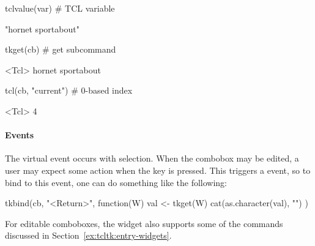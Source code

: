 \begin{Schunk}
\begin{Sinput}
 tclvalue(var)                           # TCL variable
\end{Sinput}
\begin{Soutput}
[1] "hornet sportabout"
\end{Soutput}
\begin{Sinput}
 tkget(cb)                               # get subcommand
\end{Sinput}
\begin{Soutput}
<Tcl> hornet sportabout 
\end{Soutput}
\begin{Sinput}
 tcl(cb, "current")                      # 0-based index
\end{Sinput}
\begin{Soutput}
<Tcl> 4 
\end{Soutput}
\end{Schunk}

\paragraph{Events}
The virtual event  occurs with selection. When the combobox may be edited, a user may expect some action when the  key is pressed. This triggers a  event, so to bind to this event, one can do something like the following:

\begin{Schunk}
\begin{Sinput}
 tkbind(cb, "<Return>", function(W) {
   val <- tkget(W)
   cat(as.character(val), "\n")
 })
\end{Sinput}
\end{Schunk}

For editable comboboxes, the widget also supports some of the
 commands discussed in
Section~\ref{ex:tcltk:entry-widgets}.







